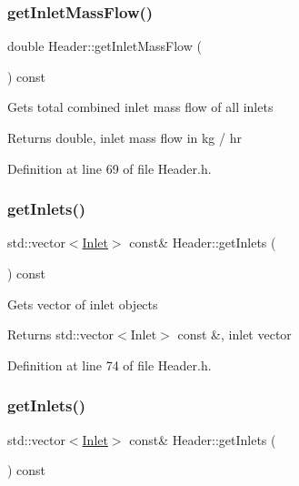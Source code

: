 \subsubsection{\texorpdfstring{get\+Inlet\+Mass\+Flow()}{getInletMassFlow()}\hspace{0.1cm}{\footnotesize\ttfamily [3/3]}}
{\footnotesize\ttfamily double Header\+::get\+Inlet\+Mass\+Flow (\begin{DoxyParamCaption}{ }\end{DoxyParamCaption}) const\hspace{0.3cm}{\ttfamily [inline]}}

Gets total combined inlet mass flow of all inlets \begin{DoxyReturn}{Returns}
double, inlet mass flow in kg / hr 
\end{DoxyReturn}


Definition at line 69 of file Header.\+h.

\mbox{\label{class_header_a625d7317488c88c949acd05c72a7c54a}} 
\subsubsection{\texorpdfstring{get\+Inlets()}{getInlets()}\hspace{0.1cm}{\footnotesize\ttfamily [1/3]}}
{\footnotesize\ttfamily std\+::vector$<$\hyperlink{class_inlet}{Inlet}$>$ const\& Header\+::get\+Inlets (\begin{DoxyParamCaption}{ }\end{DoxyParamCaption}) const\hspace{0.3cm}{\ttfamily [inline]}}

Gets vector of inlet objects \begin{DoxyReturn}{Returns}
std\+::vector$<$\+Inlet$>$ const \&, inlet vector 
\end{DoxyReturn}


Definition at line 74 of file Header.\+h.

\mbox{\label{class_header_a625d7317488c88c949acd05c72a7c54a}} 
\subsubsection{\texorpdfstring{get\+Inlets()}{getInlets()}\hspace{0.1cm}{\footnotesize\ttfamily [2/3]}}
{\footnotesize\ttfamily std\+::vector$<$\hyperlink{class_inlet}{Inlet}$>$ const\& Header\+::get\+Inlets (\begin{DoxyParamCaption}{ }\end{DoxyParamCaption}) const\hspace{0.3cm}{\ttfamily [inline]}}

